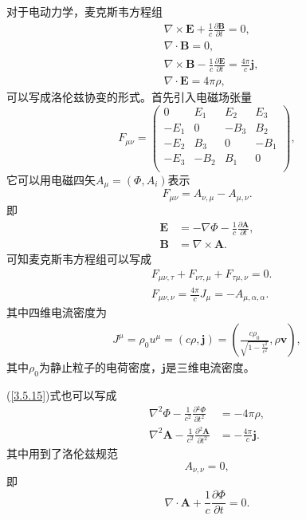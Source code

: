 \documentclass[11pt, a4paper, oneside, onecolumn]{ctexart}
\numberwithin{equation}{subsection}
\begin{document}
对于电动力学，麦克斯韦方程组
\begin{align}
&\nabla\times\boldsymbol{E}+\frac{1}{c}\frac{\partial{}\boldsymbol{B}}{\partial{}t}=0,\\
&\nabla\cdot\boldsymbol{B}=0,\\
&\nabla\times\boldsymbol{B}-\frac{1}{c}\frac{\partial{}\boldsymbol{E}}{\partial{}t}=\frac{4\pi}{c}\boldsymbol{j},\\
&\nabla\cdot\boldsymbol{E}=4\pi\rho,
\end{align}
可以写成洛伦兹协变的形式。首先引入电磁场张量
\begin{equation}
F_{\mu\nu}=\begin{pmatrix}
0 & E_{1} & E_{2} & E_{3}\\
-E_{1} & 0 & -B_{3} & B_{2}\\
-E_{2} & B_{3} & 0 & -B_{1}\\
-E_{3} & -B_{2} & B_{1} & 0\\
\end{pmatrix},
\end{equation}
它可以用电磁四矢$A_{\mu}=\left(\Phi,A_{i}\right)$表示
\begin{equation}
F_{\mu\nu}=A_{\nu,\mu}-A_{\mu,\nu}.
\end{equation}
即
\begin{align}
\boldsymbol{E}&=-\nabla\Phi-\frac{1}{c}\frac{\partial{}\boldsymbol{A}}{\partial{}t},\\
\boldsymbol{B}&=\nabla\times\boldsymbol{A}.
\end{align}
可知麦克斯韦方程组可以写成
\begin{align}
&F_{\mu\nu,\tau}+F_{\nu\tau,\mu}+F_{\tau\mu,\nu}=0.\\
&F_{\mu\nu,\nu}=\frac{4\pi}{c}J_{\mu}=-A_{\mu,\alpha,\alpha}.\label{3.5.15}
\end{align}
其中四维电流密度为
\begin{align}
J^{\mu}=\rho_{0}u^{\mu}=\left(c\rho,\boldsymbol{j}\right)=\left(\frac{c\rho_{0}}{\sqrt{1-\frac{v^{2}}{c^{2}}}},\rho\boldsymbol{v}\right),
\end{align}
其中$\rho_{0}$为静止粒子的电荷密度，$\boldsymbol{j}$是三维电流密度。

(\ref{3.5.15})式也可以写成
\begin{align}
\nabla^{2}\Phi-\frac{1}{c^{2}}\frac{\partial{}^{2}\Phi}{\partial{}t^{2}}&=-4\pi\rho,\\
\nabla^{2}\boldsymbol{A}-\frac{1}{c^{2}}\frac{\partial{}^{2}\boldsymbol{A}}{\partial{}t^{2}}&=-\frac{4\pi}{c}\boldsymbol{j}.
\end{align}
其中用到了洛伦兹规范
\begin{equation}
A_{\nu,\nu}=0,
\end{equation}
即
\begin{equation}
\nabla\cdot\boldsymbol{A}+\frac{1}{c}\frac{\partial{}\Phi}{\partial{}t}=0.
\end{equation}
\end{document}
